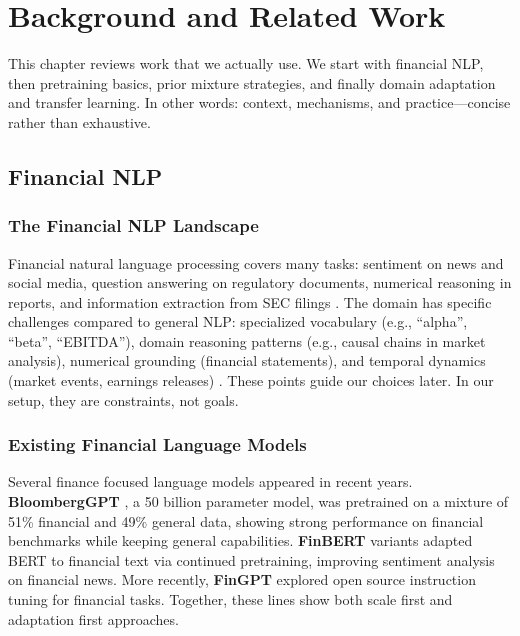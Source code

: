 \chapter{Background and Related Work}

This chapter reviews work that we actually use. We start with financial NLP, then pretraining basics, prior mixture strategies, and finally domain adaptation and transfer learning. In other words: context, mechanisms, and practice—concise rather than exhaustive.

\section{Financial NLP}

\subsection{The Financial NLP Landscape}

Financial natural language processing covers many tasks: sentiment on news and social media, question answering on regulatory documents, numerical reasoning in reports, and information extraction from SEC filings \parencite{araci2019finbert, chen2021finqa}. The domain has specific challenges compared to general NLP: specialized vocabulary (e.g., ``alpha'', ``beta'', ``EBITDA''), domain reasoning patterns (e.g., causal chains in market analysis), numerical grounding (financial statements), and temporal dynamics (market events, earnings releases) \parencite{wu2023bloomberggpt, araci2019finbert}. These points guide our choices later. In our setup, they are constraints, not goals.

\subsection{Existing Financial Language Models}

Several finance focused language models appeared in recent years. \textbf{BloombergGPT} \parencite{wu2023bloomberggpt}, a 50 billion parameter model, was pretrained on a mixture of 51\% financial and 49\% general data, showing strong performance on financial benchmarks while keeping general capabilities. \textbf{FinBERT} variants \parencite{araci2019finbert, yang2020finbert} adapted BERT to financial text via continued pretraining, improving sentiment analysis on financial news. More recently, \textbf{FinGPT} \parencite{yang2023fingpt} explored open source instruction tuning for financial tasks. Together, these lines show both scale first and adaptation first approaches.

